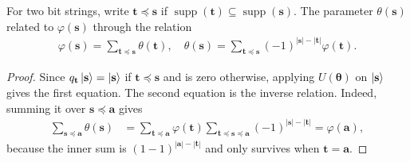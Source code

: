 \begin{lemma}
    \label{lem:trans_phase}
    For two bit strings, write $\mathbf{t}\preceq \mathbf{s}$ if $\operatorname{supp}(\mathbf{t})\subseteq \operatorname{supp}(\mathbf{s})$.
    The parameter $\theta(\mathbf{s})$ related to $\varphi(\mathbf{s})$ through the relation
    \begin{align}
        \varphi(\mathbf{s}) = \sum_{\mathbf{t}\preceq \mathbf{s}}\theta(\mathbf{t}),\quad
        \theta(\mathbf{s}) = \sum_{\mathbf{t}\preceq \mathbf{s}}(-1)^{|\mathbf{s}|-|\mathbf{t}|}\varphi(\mathbf{t}).
    \end{align}
\end{lemma}
\begin{proof}
    Since $q_{\mathbf{t}}\ket{\mathbf{s}} = \ket{\mathbf{s}}$ if $\mathbf{t}\preceq\mathbf{s}$ and is zero otherwise, applying $U(\mathbf{\theta})$ on $\ket{\mathbf{s}}$ gives the first equation.
    The second equation is the inverse relation. Indeed, summing it over $\mathbf{s}\preceq \mathbf{a}$ gives
    \begin{align}
        \sum_{\mathbf{s}\preceq \mathbf{a}}\theta(\mathbf{s})
        &= \sum_{\mathbf{t}\preceq \mathbf{a}}\varphi(\mathbf{t})
        \sum_{\mathbf{t}\preceq \mathbf{s}\preceq \mathbf{a}}(-1)^{|\mathbf{s}|-|\mathbf{t}|}
        = \varphi(\mathbf{a}),
    \end{align}
    because the inner sum is $(1-1)^{|\mathbf{a}|-|\mathbf{t}|}$ and only survives when $\mathbf{t}=\mathbf{a}$.
\end{proof}

